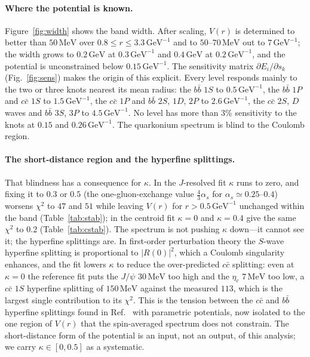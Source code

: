 \documentclass[10pt,twocolumn]{article}
\newcommand{\cc}{c\bar c}
\newcommand{\bb}{b\bar b}
\newcommand{\MeV}{\,\mathrm{MeV}}
\newcommand{\GeV}{\,\mathrm{GeV}}
\newcommand{\GeVi}{\,\mathrm{GeV}^{-1}}
\begin{document}
\paragraph{Where the potential is known.}
Figure~\ref{fig:width} shows the band width.
After scaling, $V(r)$ is determined to better than $50\MeV$ over $0.8\le r\le3.3\GeVi$ and to $50$--$70\MeV$ out to $7\GeVi$; the width grows to $0.2\GeV$ at $0.3\GeVi$ and $0.4\GeV$ at $0.2\GeVi$, and the potential is unconstrained below $0.15\GeVi$.
The sensitivity matrix $\partial E_i/\partial s_k$ (Fig.~\ref{fig:sens}) makes the origin of this explicit.
Every level responds mainly to the two or three knots nearest its mean radius: the $\bb$ $1S$ to $0.5\GeVi$, the $\bb$ $1P$ and $\cc$ $1S$ to $1.5\GeVi$, the $\cc$ $1P$ and $\bb$ $2S$, $1D$, $2P$ to $2.6\GeVi$, the $\cc$ $2S$, $D$ waves and $\bb$ $3S$, $3P$ to $4.5\GeVi$.
No level has more than 3\% sensitivity to the knots at $0.15$ and $0.26\GeVi$.
The quarkonium spectrum is blind to the Coulomb region.

\paragraph{The short-distance region and the hyperfine splittings.}
That blindness has a consequence for $\kappa$.
In the $J$-resolved fit $\kappa$ runs to zero, and fixing it to $0.3$ or $0.5$ (the one-gluon-exchange value $\tfrac43\alpha_s$ for $\alpha_s\simeq0.25$--$0.4$) worsens $\chi^2$ to $47$ and $51$ while leaving $V(r)$ for $r>0.5\GeVi$ unchanged within the band (Table~\ref{tab:stab}); in the centroid fit $\kappa=0$ and $\kappa=0.4$ give the same $\chi^2$ to $0.2$ (Table~\ref{tab:cstab}).
The spectrum is not pushing $\kappa$ down---it cannot see it; the hyperfine splittings are.
In first-order perturbation theory the $S$-wave hyperfine splitting is proportional to $|R(0)|^2$, which a Coulomb singularity enhances, and the fit lowers $\kappa$ to reduce the over-predicted $\cc$ splitting: even at $\kappa=0$ the reference fit puts the $J/\psi$ $30\MeV$ too high and the $\eta_c$ $7\MeV$ too low, a $\cc$ $1S$ hyperfine splitting of $150\MeV$ against the measured $113$, which is the largest single contribution to its $\chi^2$.
This is the tension between the $\cc$ and $\bb$ hyperfine splittings found in Ref.~\cite{Oppong2026} with parametric potentials, now isolated to the one region of $V(r)$ that the spin-averaged spectrum does not constrain.
The short-distance form of the potential is an input, not an output, of this analysis; we carry $\kappa\in[0,0.5]$ as a systematic.
\end{document}
